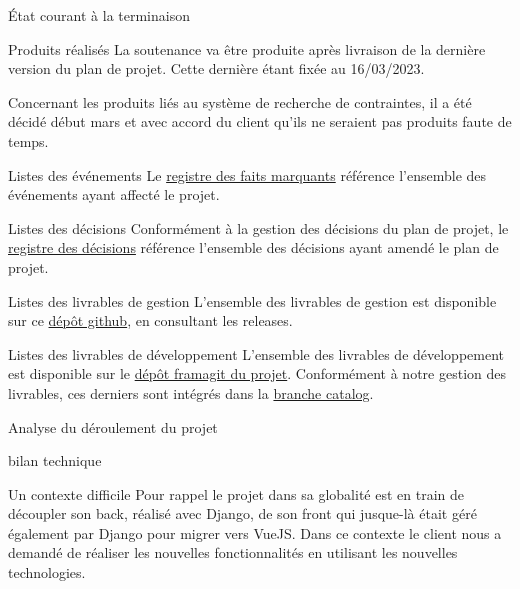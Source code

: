 \documentclass[]{article}
\begin{document}
{\begin{section}{État courant à la terminaison}
\begin{subsection}{Produits réalisés}
     La soutenance va être produite après livraison de la dernière version du plan de projet. Cette dernière étant fixée au 16/03/2023.

     Concernant les produits liés au système de recherche de contraintes, il a été décidé début mars et avec accord du client qu’ils ne seraient pas produits faute de temps.
 \end{subsection}

 \begin{subsection}{Listes des événements}
     Le \href{Registre_des_faits_marquants.pdf}{registre des faits marquants} référence l'ensemble des événements ayant affecté le projet.
 \end{subsection}

 \begin{subsection}{Listes des décisions}
     Conformément à la gestion des décisions du plan de projet, le \href{Registre_des_décisions.pdf}{registre des décisions} référence l'ensemble des décisions ayant amendé le plan de projet.
 \end{subsection}

 \begin{subsection}{Listes des livrables de gestion}
     L'ensemble des livrables de gestion est disponible sur ce \href{https://github.com/Szyckaa/UE-PROJET-DOCS-GESTION}{dépôt github}, en consultant les releases.
 \end{subsection}

 \begin{subsection}{Listes des livrables de développement}
     L'ensemble des livrables de développement est disponible sur le \href{https://framagit.org/flopedt/FlOpEDT}{dépôt framagit du projet}. Conformément à notre gestion des livrables, ces derniers sont intégrés dans la \href{https://framagit.org/flopedt/FlOpEDT/-/tree/catalog}{branche catalog}.
 \end{subsection}
\end{section}

\newpage

\begin{section}{Analyse du déroulement du projet}
 \begin{subsection}{bilan technique}
     \begin{subsubsection}{Un contexte difficile}
         Pour rappel le projet dans sa globalité est en train de découpler son back, réalisé avec Django, de son front qui jusque-là était géré également par Django pour migrer vers VueJS. Dans ce contexte le client nous a demandé de réaliser les nouvelles fonctionnalités en utilisant les nouvelles technologies.


\end{subsubsection}
\end{subsection}
\end{section}}
\end{document}
